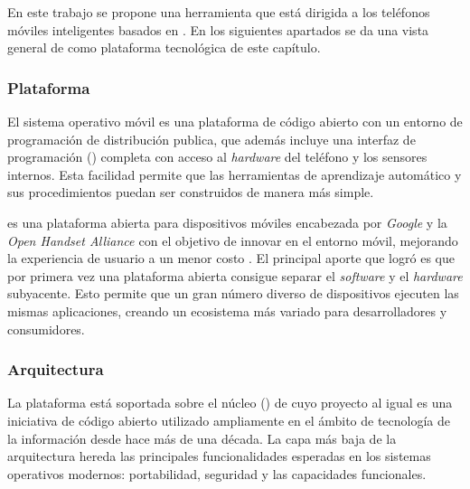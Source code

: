 En este trabajo se propone una herramienta que está dirigida a los
teléfonos móviles inteligentes basados en \emph{}.
En los siguientes apartados se da una vista general de \emph{
}como plataforma tecnológica de este capítulo.

\subsubsection{Plataforma}

El sistema operativo móvil \emph{} es una plataforma
de código abierto con un entorno de programación de distribución publica,
que además incluye una interfaz de programación () completa
con acceso al \emph{hardware} del teléfono y los sensores internos.
Esta facilidad permite que las herramientas de aprendizaje automático
y sus procedimientos puedan ser construidos de manera más simple. 

\emph{} es una plataforma abierta para dispositivos
móviles encabezada por \emph{Google} y la \emph{Open Handset Alliance
\cite{OHA2008}} con el objetivo de innovar en el entorno móvil, mejorando
la experiencia de usuario a un menor costo \cite{Gargenta2014}. El
principal aporte que logró \emph{} es que por primera
vez una plataforma abierta consigue separar el \emph{software} y el
\emph{hardware} subyacente. Esto permite que un gran número diverso
de dispositivos ejecuten las mismas aplicaciones, creando un ecosistema
más variado para desarrolladores y consumidores. 

\subsubsection{Arquitectura}

La plataforma \emph{} está soportada sobre el núcleo
(\emph{}) de\emph{  }cuyo proyecto al igual
es una iniciativa de código abierto utilizado ampliamente en el ámbito
de tecnología de la información desde hace más de una década. La capa
más baja de la arquitectura hereda las principales funcionalidades
esperadas en los sistemas operativos modernos: portabilidad, seguridad
y las capacidades funcionales.

